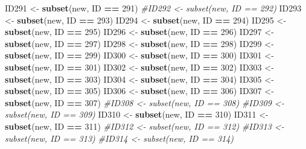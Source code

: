 \documentclass[
]{book}
\newenvironment{Shaded}{\begin{snugshade}}{\end{snugshade}}
\newcommand{\CommentTok}[1]{\textcolor[rgb]{0.56,0.35,0.01}{\textit{#1}}}
\newcommand{\DecValTok}[1]{\textcolor[rgb]{0.00,0.00,0.81}{#1}}
\newcommand{\KeywordTok}[1]{\textcolor[rgb]{0.13,0.29,0.53}{\textbf{#1}}}
\newcommand{\NormalTok}[1]{#1}
\newcommand{\OperatorTok}[1]{\textcolor[rgb]{0.81,0.36,0.00}{\textbf{#1}}}
\newcommand{\StringTok}[1]{\textcolor[rgb]{0.31,0.60,0.02}{#1}}
\begin{document}
\begin{Shaded}
\begin{Highlighting}[]
{{{{{{\NormalTok{ID291 <-}\StringTok{ }\KeywordTok{subset}\NormalTok{(new, ID }\OperatorTok{==}\StringTok{ }\DecValTok{291}\NormalTok{)}
\CommentTok{#ID292 <- subset(new, ID == 292)}
\NormalTok{ID293 <-}\StringTok{ }\KeywordTok{subset}\NormalTok{(new, ID }\OperatorTok{==}\StringTok{ }\DecValTok{293}\NormalTok{)}
\NormalTok{ID294 <-}\StringTok{ }\KeywordTok{subset}\NormalTok{(new, ID }\OperatorTok{==}\StringTok{ }\DecValTok{294}\NormalTok{)}
\NormalTok{ID295 <-}\StringTok{ }\KeywordTok{subset}\NormalTok{(new, ID }\OperatorTok{==}\StringTok{ }\DecValTok{295}\NormalTok{)}
\NormalTok{ID296 <-}\StringTok{ }\KeywordTok{subset}\NormalTok{(new, ID }\OperatorTok{==}\StringTok{ }\DecValTok{296}\NormalTok{)}
\NormalTok{ID297 <-}\StringTok{ }\KeywordTok{subset}\NormalTok{(new, ID }\OperatorTok{==}\StringTok{ }\DecValTok{297}\NormalTok{)}
\NormalTok{ID298 <-}\StringTok{ }\KeywordTok{subset}\NormalTok{(new, ID }\OperatorTok{==}\StringTok{ }\DecValTok{298}\NormalTok{)}
\NormalTok{ID299 <-}\StringTok{ }\KeywordTok{subset}\NormalTok{(new, ID }\OperatorTok{==}\StringTok{ }\DecValTok{299}\NormalTok{)}
\NormalTok{ID300 <-}\StringTok{ }\KeywordTok{subset}\NormalTok{(new, ID }\OperatorTok{==}\StringTok{ }\DecValTok{300}\NormalTok{)}
\NormalTok{ID301 <-}\StringTok{ }\KeywordTok{subset}\NormalTok{(new, ID }\OperatorTok{==}\StringTok{ }\DecValTok{301}\NormalTok{)}
\NormalTok{ID302 <-}\StringTok{ }\KeywordTok{subset}\NormalTok{(new, ID }\OperatorTok{==}\StringTok{ }\DecValTok{302}\NormalTok{)}
\NormalTok{ID303 <-}\StringTok{ }\KeywordTok{subset}\NormalTok{(new, ID }\OperatorTok{==}\StringTok{ }\DecValTok{303}\NormalTok{)}
\NormalTok{ID304 <-}\StringTok{ }\KeywordTok{subset}\NormalTok{(new, ID }\OperatorTok{==}\StringTok{ }\DecValTok{304}\NormalTok{)}
\NormalTok{ID305 <-}\StringTok{ }\KeywordTok{subset}\NormalTok{(new, ID }\OperatorTok{==}\StringTok{ }\DecValTok{305}\NormalTok{)}
\NormalTok{ID306 <-}\StringTok{ }\KeywordTok{subset}\NormalTok{(new, ID }\OperatorTok{==}\StringTok{ }\DecValTok{306}\NormalTok{)}
\NormalTok{ID307 <-}\StringTok{ }\KeywordTok{subset}\NormalTok{(new, ID }\OperatorTok{==}\StringTok{ }\DecValTok{307}\NormalTok{)}
\CommentTok{#ID308 <- subset(new, ID == 308)}
\CommentTok{#ID309 <- subset(new, ID == 309)}
\NormalTok{ID310 <-}\StringTok{ }\KeywordTok{subset}\NormalTok{(new, ID }\OperatorTok{==}\StringTok{ }\DecValTok{310}\NormalTok{)}
\NormalTok{ID311 <-}\StringTok{ }\KeywordTok{subset}\NormalTok{(new, ID }\OperatorTok{==}\StringTok{ }\DecValTok{311}\NormalTok{)}
\CommentTok{#ID312 <- subset(new, ID == 312)}
\CommentTok{#ID313 <- subset(new, ID == 313)}
\CommentTok{#ID314 <- subset(new, ID == 314)}

}}}}}}
\end{Highlighting}
\end{Shaded}
\end{document}
